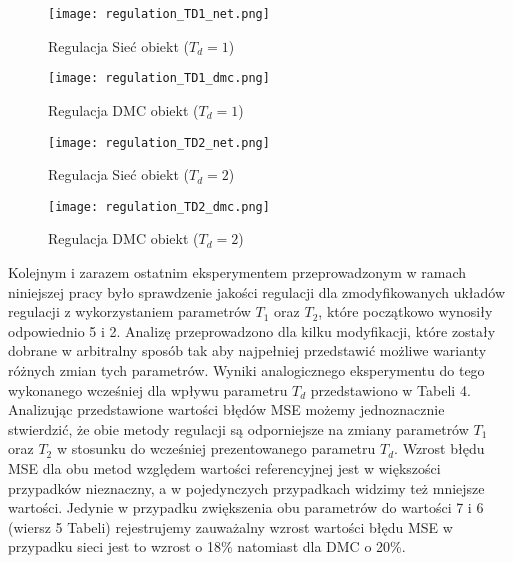 \begin{figure}[!h]
\centering
\begin{minipage}{.5\textwidth}
  \label{fig:Regulation-TD1-net}
  \centering \texttt{[image: regulation\_TD1\_net.png]}
  \caption{Regulacja Sieć obiekt (\(T_d=1\))}
  \label{fig:test1}
\end{minipage}%
\begin{minipage}{.5\textwidth}
  \label{fig:Regulation-TD1-dmc}
  \centering \texttt{[image: regulation\_TD1\_dmc.png]}
  \caption{Regulacja DMC obiekt (\(T_d=1\))}
\end{minipage}
\end{figure}

\begin{figure}[!h]
\centering
\begin{minipage}{.5\textwidth}
  \label{fig:Regulation-TD2-net}
  \centering \texttt{[image: regulation\_TD2\_net.png]}
  \caption{Regulacja Sieć obiekt (\(T_d=2\))}
  \label{fig:test1}
\end{minipage}%
\begin{minipage}{.5\textwidth}
  \label{fig:Regulation-TD2-dmc}
  \centering \texttt{[image: regulation\_TD2\_dmc.png]}
  \caption{Regulacja DMC obiekt (\(T_d=2\))}
\end{minipage}
\end{figure}

\par Kolejnym i zarazem ostatnim eksperymentem przeprowadzonym w ramach niniejszej pracy było sprawdzenie jakości regulacji dla zmodyfikowanych układów regulacji z wykorzystaniem parametrów \(T_1\) oraz \(T_2\), które początkowo wynosiły odpowiednio 5 i 2. Analizę przeprowadzono dla kilku modyfikacji, które zostały dobrane w arbitralny sposób tak aby najpełniej przedstawić możliwe warianty różnych zmian tych parametrów. Wyniki analogicznego eksperymentu do tego wykonanego wcześniej dla wpływu parametru \(T_d\) przedstawiono w Tabeli 4. Analizując przedstawione wartości błędów MSE możemy jednoznacznie stwierdzić, że obie metody regulacji są odporniejsze na zmiany parametrów \(T_1\) oraz \(T_2\) w stosunku do wcześniej prezentowanego parametru \(T_d\). Wzrost błędu MSE dla obu metod względem wartości referencyjnej jest w większości przypadków nieznaczny, a w pojedynczych przypadkach widzimy też mniejsze wartości. Jedynie w przypadku zwiększenia obu parametrów do wartości 7 i 6 (wiersz 5 Tabeli) rejestrujemy zauważalny wzrost wartości błędu MSE w przypadku sieci jest to wzrost o 18\% natomiast dla DMC o 20\%.     

